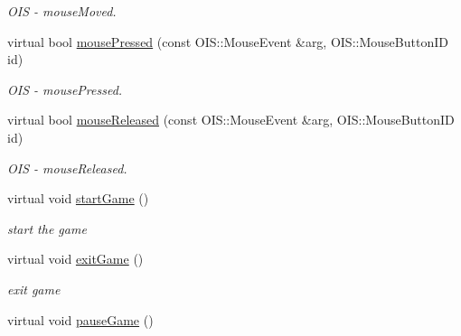 \begin{DoxyCompactItemize}
\begin{DoxyCompactList}\small\item\em O\+IS -\/ mouse\+Moved. \end{DoxyCompactList}\item 
virtual bool \hyperlink{class_basic_tutorial__00_af0e5dec72c58e157c2a63ffa5fd8c7c7}{mouse\+Pressed} (const O\+I\+S\+::\+Mouse\+Event \&arg, O\+I\+S\+::\+Mouse\+Button\+ID id)\hypertarget{class_basic_tutorial__00_af0e5dec72c58e157c2a63ffa5fd8c7c7}{}\label{class_basic_tutorial__00_af0e5dec72c58e157c2a63ffa5fd8c7c7}

\begin{DoxyCompactList}\small\item\em O\+IS -\/ mouse\+Pressed. \end{DoxyCompactList}\item 
virtual bool \hyperlink{class_basic_tutorial__00_aeb28d7b68dcaf536f513e25afb6947d7}{mouse\+Released} (const O\+I\+S\+::\+Mouse\+Event \&arg, O\+I\+S\+::\+Mouse\+Button\+ID id)\hypertarget{class_basic_tutorial__00_aeb28d7b68dcaf536f513e25afb6947d7}{}\label{class_basic_tutorial__00_aeb28d7b68dcaf536f513e25afb6947d7}

\begin{DoxyCompactList}\small\item\em O\+IS -\/ mouse\+Released. \end{DoxyCompactList}\item 
virtual void \hyperlink{class_basic_tutorial__00_a875932b8b12f508f432cba994934ff8c}{start\+Game} ()\hypertarget{class_basic_tutorial__00_a875932b8b12f508f432cba994934ff8c}{}\label{class_basic_tutorial__00_a875932b8b12f508f432cba994934ff8c}

\begin{DoxyCompactList}\small\item\em start the game \end{DoxyCompactList}\item 
virtual void \hyperlink{class_basic_tutorial__00_a98d19aa5e1a903e86e5a900f7b2d768b}{exit\+Game} ()\hypertarget{class_basic_tutorial__00_a98d19aa5e1a903e86e5a900f7b2d768b}{}\label{class_basic_tutorial__00_a98d19aa5e1a903e86e5a900f7b2d768b}

\begin{DoxyCompactList}\small\item\em exit game \end{DoxyCompactList}\item 
virtual void \hyperlink{class_basic_tutorial__00_a46299119fe4c936154cd8c5d346a3a5c}{pause\+Game} ()\hypertarget{class_basic_tutorial__00_a46299119fe4c936154cd8c5d346a3a5c}{}\label{class_basic_tutorial__00_a46299119fe4c936154cd8c5d346a3a5c}


\end{DoxyCompactItemize}
